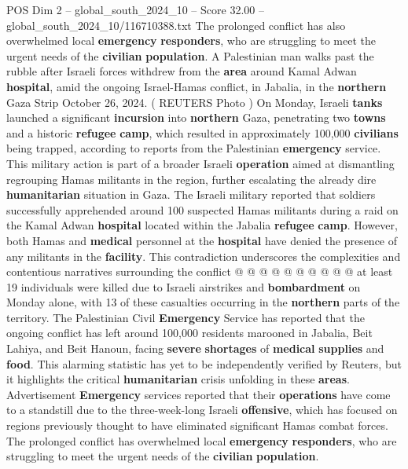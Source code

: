 \begin{textsample}{POS Dim 2 – global\_south\_2024\_10 – Score 32.00 – global\_south\_2024\_10/116710388.txt}  \label{ex:f2_pos_131}
The prolonged conflict has also overwhelmed local \textbf{emergency} \textbf{responders}, who are struggling to meet the urgent needs of the \textbf{civilian} \textbf{population}.
A Palestinian man walks past the rubble after Israeli forces withdrew from the \textbf{area} around Kamal Adwan \textbf{hospital}, amid the ongoing Israel-Hamas conflict, in Jabalia, in the \textbf{northern} Gaza Strip October 26, 2024. ( REUTERS Photo ) On Monday, Israeli \textbf{tanks} launched a significant \textbf{incursion} into \textbf{northern} Gaza, penetrating two \textbf{towns} and a historic \textbf{refugee} \textbf{camp}, which resulted in approximately 100,000 \textbf{civilians} being trapped, according to reports from the Palestinian \textbf{emergency} service.
This military action is part of a broader Israeli \textbf{operation} aimed at dismantling regrouping Hamas militants in the region, further escalating the already dire \textbf{humanitarian} situation in Gaza.
The Israeli military reported that soldiers successfully apprehended around 100 suspected Hamas militants during a raid on the Kamal Adwan \textbf{hospital} located within the Jabalia \textbf{refugee} \textbf{camp}.
However, both Hamas and \textbf{medical} personnel at the \textbf{hospital} have denied the presence of any militants in the \textbf{facility}.
This contradiction underscores the complexities and contentious narratives surrounding the conflict @ @ @ @ @ @ @ @ @ @ at least 19 individuals were killed due to Israeli airstrikes and \textbf{bombardment} on Monday alone, with 13 of these casualties occurring in the \textbf{northern} parts of the territory.
The Palestinian Civil \textbf{Emergency} Service has reported that the ongoing conflict has left around 100,000 residents marooned in Jabalia, Beit Lahiya, and Beit Hanoun, facing \textbf{severe} \textbf{shortages} of \textbf{medical} \textbf{supplies} and \textbf{food}.
This alarming statistic has yet to be independently verified by Reuters, but it highlights the critical \textbf{humanitarian} crisis unfolding in these \textbf{areas}.
Advertisement \textbf{Emergency} services reported that their \textbf{operations} have come to a standstill due to the three-week-long Israeli \textbf{offensive}, which has focused on regions previously thought to have eliminated significant Hamas combat forces.
The prolonged conflict has overwhelmed local \textbf{emergency} \textbf{responders}, who are struggling to meet the urgent needs of the \textbf{civilian} \textbf{population}.

\end{textsample}
